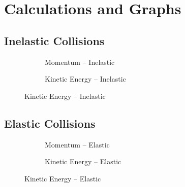\section*{Calculations and Graphs}
\captionsetup[subfigure]{labelformat=empty}

\subsection*{Inelastic Collisions}

\begin{figure}[H]
    \centering
    \begin{subfigure}[b]{0.49\textwidth}
        \centering
        \caption{Momentum -- Inelastic}
        
    \end{subfigure}
    \begin{subfigure}[b]{0.49\textwidth}
        \centering
        \caption{Kinetic Energy -- Inelastic}
        
    \end{subfigure}
\end{figure}

\subsection*{Elastic Collisions}

\begin{figure}[H]
    \centering
    \begin{subfigure}[b]{0.49\textwidth}
        \centering
        \caption{Momentum -- Elastic}
        
    \end{subfigure}
    \begin{subfigure}[b]{0.49\textwidth}
        \centering
        \caption{Kinetic Energy -- Elastic}
        
    \end{subfigure}
\end{figure}
